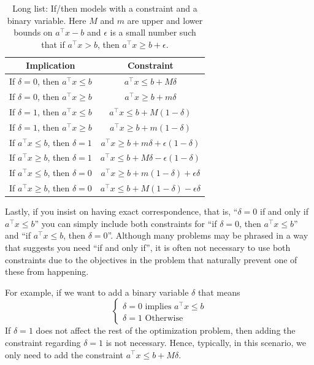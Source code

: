 \begin{table}
\begin{center}
\begin{tabular}{|c|c|}
\hline
\textbf{Implication} & \textbf{Constraint}\\
\hline
If $\delta = 0$, then $a^\top x \leq b$ & $a^\top x \leq b + M \delta$\\
If $\delta = 0$, then $a^\top x \geq b$ & $a^\top x \geq b + m \delta$\\
If $\delta = 1$, then $a^\top x \leq b$ & $a^\top x \leq b + M (1-\delta)$\\
If $\delta = 1$, then $a^\top x \geq b$ & $a^\top x \geq b + m (1-\delta)$\\
If $a^\top x \leq b$, then $\delta = 1$ & $a^\top x \geq b + m \delta + \epsilon(1-\delta)$\\
If $a^\top x \geq b$, then $\delta = 1$ & $a^\top x \leq b + M \delta - \epsilon(1-\delta)$\\
If $a^\top x \leq b$, then $\delta = 0$ & $a^\top x \geq b + m (1-\delta) + \epsilon \delta$\\
If $a^\top x \geq b$, then $\delta = 0$ & $a^\top x \leq b + M (1-\delta) - \epsilon \delta$\\
\hline
\end{tabular}
\end{center}
\caption{Long list: If/then models with a constraint and a binary variable.  Here $M$ and $m$ are upper and lower bounds on $a^\top x - b$ and $\epsilon$ is a small number such that if $a^\top x > b$, then $a^\top x \geq b + \epsilon$.}
\end{table}
Lastly, if you insist on having exact correspondence, that is, ``$\delta = 0 $ if and only if $a^\top x \leq b$'' you can simply include both constraints for ``if $\delta = 0 $, then $a^\top x \leq b$'' and ``if $a^\top x \leq b$, then $\delta = 0 $''.  Although many problems may be phrased in a way that suggests you need ``if and only if'', it is often not necessary to use both constraints due to the objectives in the problem that naturally prevent one of these from happening.  

For example, if we want to add a binary variable $\delta$ that means
$$
\begin{cases}
\delta = 0 \text{ implies }  a^\top x \leq b\\
\delta = 1  \text{ Otherwise}
\end{cases}
$$
If $\delta = 1$ does not affect the rest of the optimization problem, then adding the constraint regarding $\delta = 1$ is not necessary.  Hence, typically, in this scenario, we only need to add the constraint $a^\top x \leq b + M \delta$.

